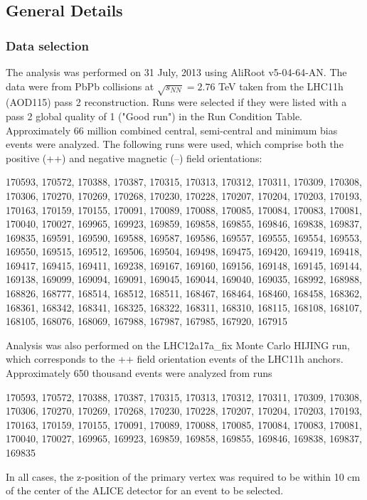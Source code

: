 \subsection{General Details}
\label{sec:GeneralDetails}

\subsubsection{Data selection}
\label{sec:DataSelection}
The analysis was performed on 31 July, 2013 using AliRoot v5-04-64-AN. The data were from PbPb collisions at $\sqrt{s_{NN}}=2.76$  TeV taken from the LHC11h (AOD115) pass 2 reconstruction. 
Runs were selected if they were listed with a pass 2 global quality of 1 ("Good run") in the Run Condition Table. 
Approximately 66 million combined central, semi-central and minimum bias events were analyzed. 
The following runs were used, which comprise both the positive (++) and negative magnetic (--) field orientations:

170593, 170572, 170388, 170387, 170315, 170313, 170312, 170311, 170309, 170308, 170306, 170270, 170269, 170268, 170230, 170228, 170207, 170204, 170203, 170193, 170163, 170159, 170155, 170091, 170089, 170088, 170085, 170084, 170083, 170081, 170040, 170027, 169965, 169923, 169859, 169858, 169855, 169846, 169838, 169837, 169835, 169591, 169590, 169588, 169587, 169586, 169557, 169555, 169554, 169553, 169550, 169515, 169512, 169506, 169504, 169498, 169475, 169420, 169419, 169418, 169417, 169415, 169411, 169238, 169167, 169160, 169156, 169148, 169145, 169144, 169138, 169099, 169094, 169091, 169045, 169044, 169040, 169035, 168992, 168988, 168826, 168777, 168514, 168512, 168511, 168467, 168464, 168460, 168458, 168362, 168361, 168342, 168341, 168325, 168322, 168311, 168310, 168115, 168108, 168107, 168105, 168076, 168069, 167988, 167987, 167985, 167920, 167915

Analysis was also performed on the LHC12a17a\_fix Monte Carlo HIJING run, which corresponds to the ++ field orientation events of the LHC11h anchors.  
Approximately 650 thousand events were analyzed from runs

170593, 170572, 170388, 170387, 170315, 170313, 170312, 170311, 170309, 170308, 170306, 170270, 170269, 170268, 170230, 170228, 170207, 170204, 170203, 170193, 170163, 170159, 170155, 170091, 170089, 170088, 170085, 170084, 170083, 170081, 170040, 170027, 169965, 169923, 169859, 169858, 169855, 169846, 169838, 169837, 169835

In all cases, the z-position of the primary vertex was required to be within 10 cm of the center of the ALICE detector for an event to be selected.  

